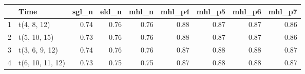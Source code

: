 \begin{table}[ht]
\centering
\begin{tabular}{rlrrrrrrr}
  \hline
 & Time & sgl\_n & eld\_n & mhl\_n & mhl\_p4 & mhl\_p5 & mhl\_p6 & mhl\_p7 \\ 
  \hline
1 & t(4, 8, 12) & 0.74 & 0.76 & 0.76 & 0.88 & 0.87 & 0.87 & 0.86 \\ 
  2 & t(5, 10, 15) & 0.73 & 0.76 & 0.76 & 0.88 & 0.87 & 0.87 & 0.86 \\ 
  3 & t(3, 6, 9, 12) & 0.74 & 0.76 & 0.76 & 0.87 & 0.88 & 0.88 & 0.87 \\ 
  4 & t(6, 10, 11, 12) & 0.73 & 0.75 & 0.75 & 0.87 & 0.88 & 0.88 & 0.87 \\ 
   \hline
\end{tabular}
\end{table}
